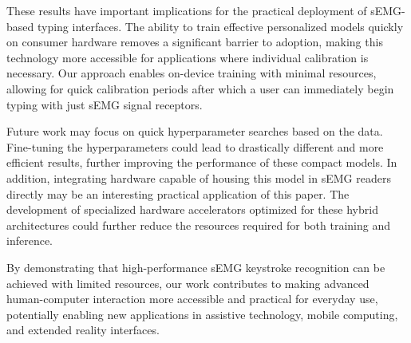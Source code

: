 \documentclass{article}
\begin{document}
These results have important implications for the practical deployment of sEMG-based typing interfaces. The ability to train effective personalized models quickly on consumer hardware removes a significant barrier to adoption, making this technology more accessible for applications where individual calibration is necessary. Our approach enables on-device training with minimal resources, allowing for quick calibration periods after which a user can immediately begin typing with just sEMG signal receptors.

Future work may focus on quick hyperparameter searches based on the data. Fine-tuning the hyperparameters could lead to drastically different and more efficient results, further improving the performance of these compact models. In addition, integrating hardware capable of housing this model in sEMG readers directly may be an interesting practical application of this paper. The development of specialized hardware accelerators optimized for these hybrid architectures could further reduce the resources required for both training and inference.

By demonstrating that high-performance sEMG keystroke recognition can be achieved with limited resources, our work contributes to making advanced human-computer interaction more accessible and practical for everyday use, potentially enabling new applications in assistive technology, mobile computing, and extended reality interfaces.




  

\appendix
\end{document}

